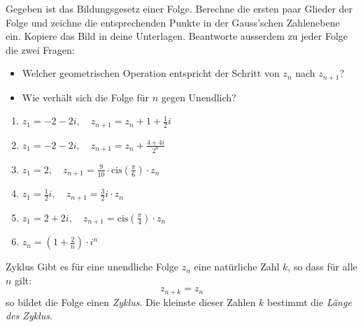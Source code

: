 \begin{LA}
    {}{}

Gegeben ist das Bildungsgesetz einer Folge. Berechne die ersten paar Glieder der Folge und zeichne die entsprechenden Punkte in der Gauss'schen Zahlenebene ein. Kopiere das Bild in deine Unterlagen. Beantworte ausserdem zu jeder Folge die zwei Fragen:

\begin{itemize}
    \item Welcher geometrischen Operation entspricht der Schritt von $z_n$ nach $z_{n+1}$?
    \item Wie verhält sich die Folge für $n$ gegen Unendlich?
\end{itemize}

\begin{enumerate}
    \item $z_1 = -2 - 2i,\quad z_{n+1} = z_n + 1 + \frac{1}{2} i$
    \item $z_1 = -2 - 2i,\quad z_{n+1} = z_n + \frac{4 + 4i}{2^n}$
    \item $z_1 = 2,\quad z_{n+1} = \frac{9}{10} \cdot  \text{cis}\left(\frac{\pi}{6}\right) \cdot z_n$
    \item $z_1 = \frac{1}{2} i,\quad z_{n+1} = \frac{3}{2} i \cdot z_n$
    \item $z_1 = 2 + 2i,\quad z_{n+1} = \text{cis}\left(\frac{\pi}{4}\right) \cdot z_n$
    \item $z_n = \left(1 + \frac{2}{n} \right) \cdot i^n$
\end{enumerate}



\end{LA}
\clearpage
\begin{definition}
    {Zyklus}{}
    Gibt es für eine unendliche Folge $z_n$ eine natürliche Zahl $k$, so dass für alle $n$ gilt: $$z_{n+k} = z_n$$
    so bildet die Folge einen \emph{Zyklus}. Die kleinste dieser Zahlen $k$ bestimmt die \emph{Länge des Zyklus}.
\end{definition}

